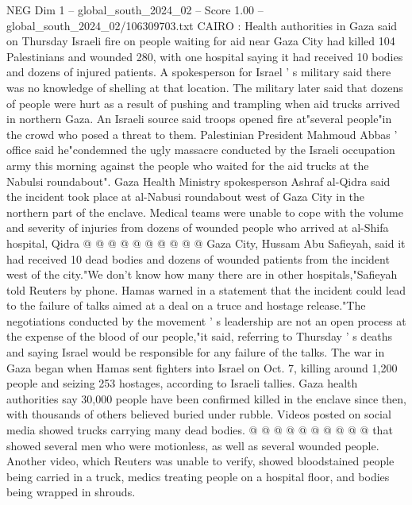 \begin{textsample}{NEG Dim 1 – global\_south\_2024\_02 – Score 1.00 – global\_south\_2024\_02/106309703.txt}  \label{ex:f1_neg_250}
CAIRO : Health authorities in Gaza said on Thursday Israeli fire on people waiting for aid near Gaza City had killed 104 Palestinians and wounded 280, with one hospital saying it had received 10 bodies and dozens of injured patients.
A spokesperson for Israel ' s military said there was no knowledge of shelling at that location.
The military later said that dozens of people were hurt as a result of pushing and trampling when aid trucks arrived in northern Gaza.
An Israeli source said troops opened fire at"several people"in the crowd who posed a threat to them.
Palestinian President Mahmoud Abbas ' office said he"condemned the ugly massacre conducted by the Israeli occupation army this morning against the people who waited for the aid trucks at the Nabulsi roundabout".
Gaza Health Ministry spokesperson Ashraf al-Qidra said the incident took place at al-Nabusi roundabout west of Gaza City in the northern part of the enclave.
Medical teams were unable to cope with the volume and severity of injuries from dozens of wounded people who arrived at al-Shifa hospital, Qidra @ @ @ @ @ @ @ @ @ @ Gaza City, Hussam Abu Safieyah, said it had received 10 dead bodies and dozens of wounded patients from the incident west of the city."We don't know how many there are in other hospitals,"Safieyah told Reuters by phone.
Hamas warned in a statement that the incident could lead to the failure of talks aimed at a deal on a truce and hostage release."The negotiations conducted by the movement ' s leadership are not an open process at the expense of the blood of our people,"it said, referring to Thursday ' s deaths and saying Israel would be responsible for any failure of the talks.
The war in Gaza began when Hamas sent fighters into Israel on Oct. 7, killing around 1,200 people and seizing 253 hostages, according to Israeli tallies.
Gaza health authorities say 30,000 people have been confirmed killed in the enclave since then, with thousands of others believed buried under rubble.
Videos posted on social media showed trucks carrying many dead bodies. @ @ @ @ @ @ @ @ @ @ that showed several men who were motionless, as well as several wounded people.
Another video, which Reuters was unable to verify, showed bloodstained people being carried in a truck, medics treating people on a hospital floor, and bodies being wrapped in shrouds.

\end{textsample}
